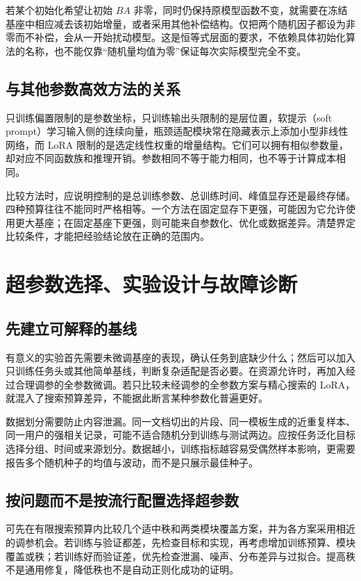 \documentclass[UTF8,12pt,a4paper,fontset=fandol]{ctexart}
\begin{document}
若某个初始化希望让初始 $BA$ 非零，同时仍保持原模型函数不变，就需要在冻结基座中相应减去该初始增量，或者采用其他补偿结构。仅把两个随机因子都设为非零而不补偿，会从一开始扰动模型。这是恒等式层面的要求，不依赖具体初始化算法的名称，也不能仅靠“随机量均值为零”保证每次实际模型完全不变。

\subsection{与其他参数高效方法的关系}

只训练偏置限制的是参数坐标，只训练输出头限制的是层位置，软提示（soft prompt）学习输入侧的连续向量，瓶颈适配模块常在隐藏表示上添加小型非线性网络，而 LoRA 限制的是选定线性权重的增量结构。它们可以拥有相似参数量，却对应不同函数族和推理开销。参数相同不等于能力相同，也不等于计算成本相同。

比较方法时，应说明控制的是总训练参数、总训练时间、峰值显存还是最终存储。四种预算往往不能同时严格相等。一个方法在固定显存下更强，可能因为它允许使用更大基座；在固定基座下更强，则可能来自参数化、优化或数据差异。清楚界定比较条件，才能把经验结论放在正确的范围内。

\section{超参数选择、实验设计与故障诊断}
\label{sec:evaluation}

\subsection{先建立可解释的基线}

有意义的实验首先需要未微调基座的表现，确认任务到底缺少什么；然后可以加入只训练任务头或其他简单基线，判断复杂适配是否必要。在资源允许时，再加入经过合理调参的全参数微调。若只比较未经调参的全参数方案与精心搜索的 LoRA，就混入了搜索预算差异，不能据此断言某种参数化普遍更好。

数据划分需要防止内容泄漏。同一文档切出的片段、同一模板生成的近重复样本、同一用户的强相关记录，可能不适合随机分到训练与测试两边。应按任务泛化目标选择分组、时间或来源划分。数据越小，训练指标越容易受偶然样本影响，更需要报告多个随机种子的均值与波动，而不是只展示最佳种子。

\subsection{按问题而不是按流行配置选择超参数}

可先在有限搜索预算内比较几个适中秩和两类模块覆盖方案，并为各方案采用相近的调参机会。若训练与验证都差，先检查目标和实现，再考虑增加训练预算、模块覆盖或秩；若训练好而验证差，优先检查泄漏、噪声、分布差异与过拟合。提高秩不是通用修复，降低秩也不是自动正则化成功的证明。
\end{document}
